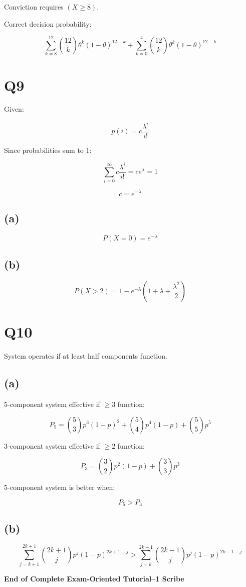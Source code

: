 \documentclass[12pt]{article}
\begin{document}
Conviction requires $(X \ge 8)$.

Correct decision probability:

\[
\sum_{k=8}^{12}
\binom{12}{k}
\theta^k(1-\theta)^{12-k}
+
\sum_{k=0}^{4}
\binom{12}{k}
\theta^k(1-\theta)^{12-k}
\]

\section*{Q9}

Given:

\[
p(i) = c\frac{\lambda^i}{i!}
\]

Since probabilities sum to 1:

\[
\sum_{i=0}^{\infty} c\frac{\lambda^i}{i!}
=
c e^{\lambda}
=
1
\]

\[
c = e^{-\lambda}
\]

\subsection*{(a)}

\[
P(X=0)
=
e^{-\lambda}
\]

\subsection*{(b)}

\[
P(X>2)
=
1 -
e^{-\lambda}\left(1+\lambda+\frac{\lambda^2}{2}\right)
\]

\section*{Q10}

System operates if at least half components function.

\subsection*{(a)}

5-component system effective if $\ge 3$ function:

\[
P_5
=
\binom{5}{3}p^3(1-p)^2
+
\binom{5}{4}p^4(1-p)
+
\binom{5}{5}p^5
\]

3-component system effective if $\ge 2$ function:

\[
P_3
=
\binom{3}{2}p^2(1-p)
+
\binom{3}{3}p^3
\]

5-component system is better when:

\[
P_5 > P_3
\]

\subsection*{(b)}

\[
\sum_{j=k+1}^{2k+1}
\binom{2k+1}{j}
p^j(1-p)^{2k+1-j}
>
\sum_{j=k}^{2k-1}
\binom{2k-1}{j}
p^j(1-p)^{2k-1-j}
\]

\bigskip

\centerline{\textbf{End of Complete Exam-Oriented Tutorial--1 Scribe}}
\end{document}

